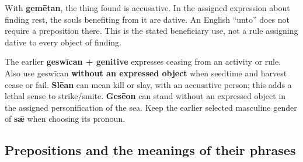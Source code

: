 With \textbf{gemētan}, the thing found is accusative. In the assigned expression about finding rest, the souls benefiting from it are dative. An English “unto” does not require a preposition there. This is the stated beneficiary use, not a rule assigning dative to every object of finding.

The earlier \textbf{geswīcan + genitive} expresses ceasing from an activity or rule. Also use geswīcan \textbf{without an expressed object} when seedtime and harvest cease or fail. \textbf{Slēan} can mean kill or slay, with an accusative person; this adds a lethal sense to strike/\allowbreak{}smite. \textbf{Gesēon} can stand without an expressed object in the assigned personification of the sea. Keep the earlier selected masculine gender of \textbf{sǣ} when choosing its pronoun.

\subsection*{Prepositions and the meanings of their phrases}

